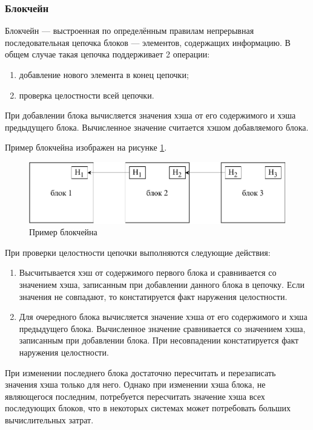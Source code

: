 \subsubsection{Блокчейн}

Блокчейн\cite{bitcoin} --- выстроенная по определённым правилам непрерывная последовательная цепочка блоков --- элементов, содержащих информацию. В общем случае такая цепочка поддерживает 2 операции:
\begin{enumerate}
    \item добавление нового элемента в конец цепочки;
    \item проверка целостности всей цепочки.
\end{enumerate}

При добавлении блока вычисляется значения хэша от его содержимого и хэша предыдущего блока. Вычисленное значение считается хэшом добавляемого блока.

Пример блокчейна изображен на рисунке \ref{fig:blockchain}.

\begin{figure}[hbtp]
    \centering
    \includegraphics[width=\textwidth]{img/blockchain.pdf}
    \caption{Пример блокчейна}
    \label{fig:blockchain}
\end{figure}

При проверки целостности цепочки выполняются следующие действия:
\begin{enumerate}
    \item Высчитывается хэш от содержимого первого блока и сравнивается со значением хэша, записанным при добавлении данного блока в цепочку. Если значения не совпадают, то констатируется факт наружения целостности.
    \item Для очередного блока вычисляется значение хэша от его содержимого и хэша предыдущего блока. Вычисленное значение сравнивается со значением хэша, записанным при добавлении блока. При несовпадении констатируется факт наружения целостности.
\end{enumerate}

При изменении последнего блока достаточно пересчитать и перезаписать значения хэша только для него. Однако при изменении хэша блока, не являющегося последним, потребуется пересчитать значение хэша всех последующих блоков, что в некоторых системах может потребовать больших вычислительных затрат.

